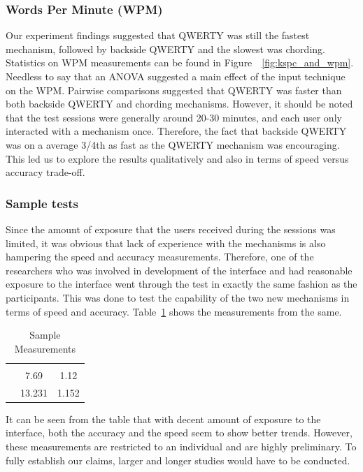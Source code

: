 \subsubsection{Words Per Minute (WPM)}

Our experiment findings suggested that QWERTY was still the fastest mechanism, followed by backside QWERTY and the slowest was chording. Statistics on WPM measurements can be found in Figure~~\ref{fig:kspc_and_wpm}. Needless to say that an ANOVA suggested a main effect of the input technique on the WPM. Pairwise comparisons suggested that QWERTY was faster than both backside QWERTY and chording mechanisms. However, it should be noted that the test sessions were generally around 20-30 minutes, and each user only interacted with a mechanism once. Therefore, the fact that backside QWERTY was on a average 3/4th as fast as the QWERTY mechanism was encouraging. This led us to explore the results qualitatively and also in terms of speed versus accuracy trade-off.


\subsubsection{Sample tests}

Since the amount of exposure that the users received during the sessions was limited, it was obvious that lack of experience with the mechanisms is also hampering the speed and accuracy
measurements. Therefore, one of the researchers who was involved in
development of the interface and had reasonable exposure to the
interface went through the test in exactly the same fashion as the
participants. This was done to test the capability of the two new
mechanisms in terms of speed and
accuracy. Table~\ref{tab:StatisticsForTestCorpora} shows the
measurements from the same.

\begin{table}
	\centering
		\begin{tabular}{rcc} 
		                         & \color{grey}{WPM}    & \color{grey}{KSPC} \\ 
                   \color{grey}{Chording} & 7.69   & 1.12 \\ 
                   \color{grey}{Backside QWERTY} & 13.231 & 1.152 \\ 
		\end{tabular}
	\caption{Sample Measurements}
	\label{tab:StatisticsForTestCorpora}
\end{table}

It can be seen from the table that with decent amount of exposure to
the interface, both the accuracy and the speed seem to show better
trends. However, these measurements are restricted to an individual
and are highly preliminary. To fully establish our claims, larger and
longer studies would have to be conducted.

